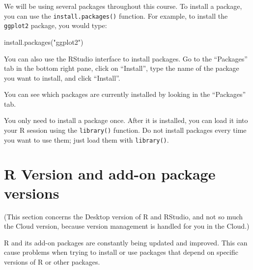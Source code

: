 \documentclass[
  letterpaper,
  8pt,
  a4paper]{book}
\newenvironment{Shaded}{\begin{snugshade}}{\end{snugshade}}
\newcommand{\FunctionTok}[1]{\textcolor[rgb]{0.28,0.35,0.67}{#1}}
\newcommand{\NormalTok}[1]{\textcolor[rgb]{0.00,0.23,0.31}{#1}}
\newcommand{\StringTok}[1]{\textcolor[rgb]{0.13,0.47,0.30}{#1}}
\begin{document}
We will be using several packages throughout this course. To install a
package, you can use the \texttt{install.packages()} function. For
example, to install the \texttt{ggplot2} package, you would type:

\begin{Shaded}
\begin{Highlighting}[]
\FunctionTok{install.packages}\NormalTok{(}\StringTok{"ggplot2"}\NormalTok{)}
\end{Highlighting}
\end{Shaded}

You can also use the RStudio interface to install packages. Go to the
``Packages'' tab in the bottom right pane, click on ``Install'', type
the name of the package you want to install, and click ``Install''.

You can see which packages are currently installed by looking in the
``Packages'' tab.

\begin{tcolorbox}[enhanced jigsaw, arc=.35mm, bottomrule=.15mm, bottomtitle=1mm, breakable, colback=white, colbacktitle=quarto-callout-tip-color!10!white, colframe=quarto-callout-tip-color-frame, coltitle=black, left=2mm, leftrule=.75mm, opacityback=0, opacitybacktitle=0.6, rightrule=.15mm, title=\textcolor{quarto-callout-tip-color}{\faLightbulb}\hspace{0.5em}{Tip}, titlerule=0mm, toprule=.15mm, toptitle=1mm]

You only need to install a package once. After it is installed, you can
load it into your R session using the \texttt{library()} function. Do
not install packages every time you want to use them; just load them
with \texttt{library()}.

\end{tcolorbox}

\section*{R Version and add-on package
versions}\label{r-version-and-add-on-package-versions}


(This section concerns the Desktop version of R and RStudio, and not so
much the Cloud version, because version management is handled for you in
the Cloud.)

R and its add-on packages are constantly being updated and improved.
This can cause problems when trying to install or use packages that
depend on specific versions of R or other packages.
\end{document}
